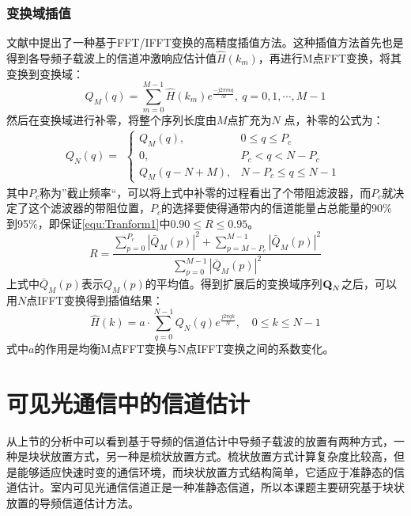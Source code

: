\subsubsection{变换域插值}
文献中提出了一种基于FFT/IFFT变换的高精度插值方法。这种插值方法首先也是得到各导频子载波上的信道冲激响应估计值$\hat{H}(k_m)$，再进行M点FFT变换，将其变换到变换域：
\begin{equation}
Q_M(q)=\sum_{m=0}^{M-1}\hat{H}(k_m)e^{\frac{-j2\pi mq}{M}},\ q=0,1,\cdots,M-1
\end{equation}
然后在变换域进行补零，将整个序列长度由$M$点扩充为$N$ 点，补零的公式为：
\begin{equation}
Q_N(q)=
\begin{aligned}
\begin{cases}
Q_M(q), &0\leq q \leq P_c \\
0, &P_c < q < N-P_c \\
Q_M(q-N+M),&N-P_c \leq  q \leq N-1
\end{cases}
\end{aligned}
\end{equation}
其中$P_c$称为”截止频率“，可以将上式中补零的过程看出了个带阻滤波器，而$P_c$就决定了这个滤波器的带阻位置，$P_c$的选择要使得通带内的信道能量占总能量的90\% 到95\%，即保证\ref{equ:Tranform1}中$0.90\leq R \leq 0.95$。
\begin{equation}
R=\frac{\sum_{p=0}^{P_c}|\bar{Q}_M(p)|^2+\sum_{p=M-P_c}^{M-1}|\bar{Q}_M(p)|^2}{\sum_{p=0}^{M-1}|\bar{Q}_M(p)|^2}
\label{equ:Tranform1}
\end{equation}
上式中$\bar{Q}_M(p)$表示$Q_M(p)$的平均值。得到扩展后的变换域序列$\textbf Q_N$之后，可以用$N$点IFFT变换得到插值结果：
\begin{equation}
\hat{H}(k) = a\cdot \sum_{q=0}^{N-1}Q_N(q)e^{\frac{j2\pi qk}{N}}, \quad 0\leq k \leq N-1
\end{equation}
式中$a$的作用是均衡M点FFT变换与N点IFFT变换之间的系数变化。
\section{可见光通信中的信道估计}
\label{section:Channel_Estimation}
从上节的分析中可以看到基于导频的信道估计中导频子载波的放置有两种方式，一种是块状放置方式，另一种是梳状放置方式。梳状放置方式计算复杂度比较高，但是能够适应快速时变的通信环境，而块状放置方式结构简单，它适应于准静态的信道估计。室内可见光通信信道正是一种准静态信道，所以本课题主要研究基于块状放置的导频信道估计方法。
